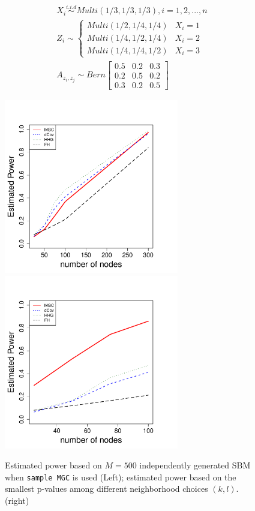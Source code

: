 \documentclass[12pt]{article}
\theoremstyle{definition}
\begin{document}
	
\begin{equation}
\begin{gathered}
	X_{i} \overset{i.i.d}{\sim} Multi(1/3, 1/3, 1/3), i = 1,2, ... , n \\ 
	Z_{i}  \sim  \left\{  \begin{array}{ccc} Multi(1/2, 1/4, 1/4) & X_{i} = 1 \\ Multi(1/4, 1/2, 1/4) & X_{i} = 2 \\ Multi(1/4, 1/4, 1/2) & X_{i} = 3  \end{array} \right. \\
	A_{z_{i}, z_{j}} \sim Bern \left[  \begin{array}{ccc}   0.5 & 0.2 &  0.3  \\ 0.2 & 0.5 & 0. 2  \\ 0.3 & 0.2 & 0.5  \end{array}  \right]
\end{gathered}
\end{equation}
	
	
\begin{figure}[H]
	\centering
	\label{fig:ame}
	\includegraphics[width=3in]{../Figure/tmp_ThreeSBM.pdf}
	\includegraphics[width=3in]{../Figure/tmp_ThreeSBM2.pdf}
	\caption{Estimated power based on $M = 500$ independently generated SBM when \texttt{sample MGC} is used (Left); estimated power based on the smallest p-values among different neighborhood choices $(k,l)$. (right) }
\end{figure}	
	
\end{document}
